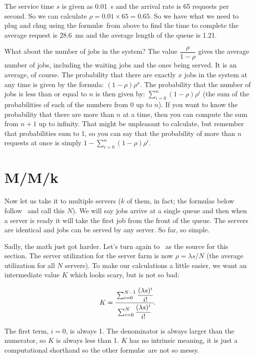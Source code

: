The service time $s$ is given as 0.01~s and the arrival rate is 65 requests per second. So we can calculate $\rho = 0.01 \times 65 = 0.65$. So we have what we need to plug and chug using the formul\ae\ from above to find the time to complete the average request is 28.6~ms and the average length of the queue is 1.21.

What about the number of jobs in the system? The value $\dfrac{\rho}{1-\rho}$ gives the average number of jobs, including the waiting jobs and the ones being served. It is an average, of course. The probability that there are exactly $x$ jobs in the system at any time is given by the formula: $(1-\rho)\rho^{x}$. The probability that the number of jobs is less than or equal to $n$ is then given by: $\sum\limits_{i=0}^{n}(1-\rho)\rho^{i}$ (the sum of the probabilities of each of the numbers from 0 up to $n$). If you want to know the probability that there are more than $n$ at a time, then you can compute the sum from $n+1$ up to infinity. That might be unpleasant to calculate, but remember that probabilities sum to 1, so you can say that the probability of more than $n$ requests at once is simply $1 - \sum\limits_{i=0}^{n}(1-\rho)\rho^{i}$.

\section*{M/M/k}

Now let us take it to multiple servers ($k$ of them, in fact; the formulas below follow~\cite{williams-q} and call this $N$). We will say jobs arrive at a single queue and then when a server is ready it will take the first job from the front of the queue. The servers are identical and jobs can be served by any server. So far, so simple.

Sadly, the math just got harder. Let's turn again to~\cite{williams-q} as the source for this section. The server utilization for the server farm is now $\rho = \lambda s / N$ (the average utilization for all $N$ servers). To make our calculations a little easier, we want an intermediate value $K$ which looks scary, but is not so bad:

\[ K = \cfrac{\sum_{i=0}^{N-1}\dfrac{(\lambda s)^{i}}{i!}}{{\sum_{i=0}^{N}\dfrac{(\lambda s)^{i}}{i!}}}.
\]

The first term, $i = 0$, is always 1. The denominator is always larger than the numerator, so $K$ is always less than 1. $K$ has no intrinsic meaning, it is just a computational shorthand so the other formul\ae\ are not so messy.

